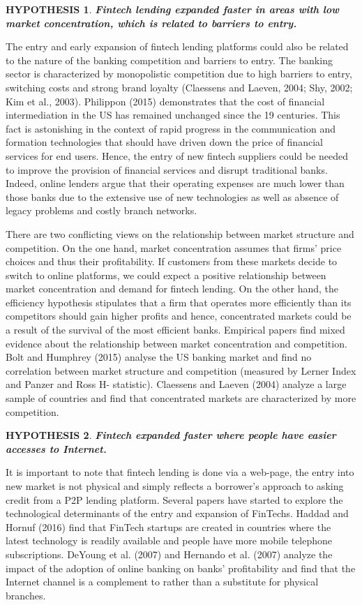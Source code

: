 \documentclass[11pt, a4paper, leqno]{article}
\newtheorem{hypothesis}{HYPOTHESIS}
\begin{document}
\begin{hypothesis}
\textbf{Fintech lending expanded faster in areas with low market concentration, which is related to barriers to entry.}
\end{hypothesis}
The entry and early expansion of fintech lending platforms could also be related to the nature of the banking competition and barriers to entry. The banking sector is characterized by monopolistic competition due to high barriers to entry, switching costs and strong brand loyalty (Claessens and Laeven, 2004; Shy, 2002; Kim et al., 2003). Philippon (2015) demonstrates that the cost of financial intermediation in the US has remained unchanged since the 19 centuries. This fact is astonishing in the context of rapid progress in the communication and formation technologies that should have driven down the price of financial services for end users. Hence, the entry of new fintech suppliers could be needed to improve the provision of financial services and disrupt traditional banks. Indeed, online lenders argue that their operating expenses are much lower than those banks due to the extensive use of new technologies as well as absence of legacy problems and costly branch networks.

There are two conflicting views on the relationship between market structure and competition. On the one hand, market concentration assumes that firms' price choices and thus their profitability. If customers from these markets decide to switch to online platforms, we could expect a positive relationship between market concentration and demand for fintech lending. On the other hand, the efficiency hypothesis stipulates that a firm that operates more efficiently than its competitors should gain higher profits and hence, concentrated markets could be a result of the survival of the most efficient banks. Empirical papers find mixed evidence about the relationship between market concentration and competition. Bolt and Humphrey (2015) analyse the US banking market and find no correlation between market structure and competition (measured by Lerner Index and Panzer and Ross H- statistic). Claessens and Laeven (2004) analyze a large sample of countries and find that concentrated markets are characterized by more competition.

\begin{hypothesis}
\textbf{Fintech expanded faster where people have easier accesses to Internet.}
\end{hypothesis}
It is important to note that fintech lending is done via a web-page, the entry into new market is not physical and simply reflects a borrower's approach to asking credit from a P2P lending platform.  Several papers have started to explore the technological determinants of the entry and expansion of FinTechs. Haddad and Hornuf (2016) find that FinTech startups are created in countries where the latest technology is readily available and people have more mobile telephone subscriptions. DeYoung et al. (2007) and Hernando et al. (2007) analyze the impact of the adoption of online banking on banks’ profitability and find that the Internet channel is a complement to rather than a substitute for physical branches. 
\end{document}
